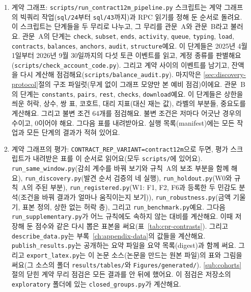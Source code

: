 \begin{enumerate}
\item 계약 그래프: \texttt{scripts/run\_contract12m\_pipeline.py} 스크립트는 계약 그래프의 빅쿼리 작업(\texttt{sql/24}부터 \texttt{sql/43}까지)과 RPC 읽기를 정해 둔 순서로 돌려요. 이 스크립트는 단계들을 두 무리로 나누고, 그 무리를 관문~A와 관문~B라고 불러요. 관문~A의 단계는 \texttt{check}, \texttt{subset}, \texttt{ends}, \texttt{activity}, \texttt{queue}, \texttt{typing}, \texttt{load}, \texttt{contracts}, \texttt{balances}, \texttt{anchors}, \texttt{audit}, \texttt{structure}예요. 이 단계들은 2025년 4월 1일부터 2026년 9월 30일까지의 다섯 토큰 이벤트를 읽고, 계정 종류를 판별해요(\texttt{scripts/check\_account\_code.py}). 그리고 계약 사이의 이벤트를 남기고, 잔액을 다시 계산해 점검해요(\texttt{scripts/balance\_audit.py}). 마지막은 \ref{sec:discovery-protocol}절의 구조 파일럿(무게 없이 그래프 모양만 본 예비 점검)이에요. 관문~B의 단계는 \texttt{constants}, \texttt{pairs}, \texttt{rest}, \texttt{checks}, \texttt{download}예요. 이 단계들은 상한을 씌운 허락, 상수, 쌍 표, 코호트, 대리 지표(대신 재는 값), 라벨의 부분들, 중요도를 계산해요. 그리고 불변 조건 64개를 점검해요. 불변 조건은 저마다 어긋난 경우의 수이고, 0이어야 해요. 그다음 표를 내려받아요. 실행 목록(manifest)에는 모든 작업과 모든 단계의 결과가 적혀 있어요.
\item 계약 그래프의 평가: \texttt{CONTRACT\_REP\_VARIANT=contract12m}으로 두면, 평가 스크립트가 내려받은 표를 이 순서로 읽어요(모두 \texttt{scripts/}에 있어요). \texttt{run\_same\_window.py}(감쇠 계수를 바꿔 보기와 규칙~A의 보조 부분을 함께 해요), \texttt{run\_discovery.py}(발견 순서 검증의 네 실행), \texttt{run\_holdout.py}(W0와 규칙~A의 주된 부분), \texttt{run\_registered.py}(W1: F1, F2, F6과 등록한 두 민감도 분석(조건을 바꿔 결과가 얼마나 움직이는지 보기)), \texttt{run\_robustness.py}(금액 기울기, 표본 정의, 상한 없는 허락 층), 그리고 \texttt{run\_benchmark.py}예요. 그다음 \texttt{run\_supplementary.py}가 어느 규칙에도 속하지 않는 대비를 계산해요. 이때 저장해 둔 점수와 같은 다시 뽑은 표본을 써요(표~\ref{tab:cpr-contrasts}). 그리고 \texttt{describe\_data.py}는 부록~\ref{ch:appendix-data}의 값들을 계산해요. \texttt{publish\_results.py}는 공개하는 요약 파일을 요약 목록(digest)과 함께 써요. 그리고 \texttt{export\_latex.py}는 이 논문 소스(논문을 만드는 원본 파일)의 표와 그림을 써요(그 소스의 폴더 \texttt{results/tables/}와 \texttt{Figures/generated/}). \ref{sub:cohorts}절의 닫힌 계약 무리 점검은 모든 결과를 안 뒤에 했어요. 이 점검은 저장소의 \texttt{exploratory} 폴더에 있는 \texttt{closed\_groups.py}가 계산해요.
\end{enumerate}

